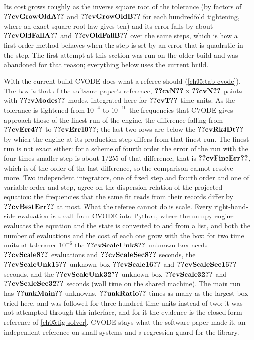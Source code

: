 Its cost grows roughly as the inverse square root of the tolerance (by factors of $\cfiveV{cvGrowOldA}$ and $\cfiveV{cvGrowOldB}$ for each hundredfold tightening, where an exact square-root law gives ten) and its error falls by about $\cfiveV{cvOldFallA}$ and $\cfiveV{cvOldFallB}$ over the same steps, which is how a first-order method behaves when the step is set by an error that is quadratic in the step.
The first attempt at this section was run on the older build and was abandoned for that reason; everything below uses the current build.

With the current build CVODE does what a referee should (\cref{ch05:tab-cvode}).
The box is that of the software paper's reference, $\cfiveV{cvN}\times\cfiveV{cvN}$ points with $\cfiveV{cvModes}$ modes, integrated here for $\cfiveV{cvT}$ time units.
As the tolerance is tightened from $10^{-4}$ to $10^{-10}$ the frequencies that CVODE gives approach those of the finest run of the engine, the difference falling from $\cfiveV{cvErr4}$ to $\cfiveV{cvErr10}$; the last two rows are below the $\cfiveV{cvRk4Dt}$ by which the engine at its production step differs from that finest run.
The finest run is not exact either: for a scheme of fourth order the error of the run with the four times smaller step is about $1/255$ of that difference, that is $\cfiveV{cvFineErr}$, which is of the order of the last difference, so the comparison cannot resolve more.
Two independent integrators, one of fixed step and fourth order and one of variable order and step, agree on the dispersion relation of the projected equation: the frequencies that the same fit reads from their records differ by $\cfiveV{cvBestErr}$ at most.
What the referee cannot do is scale.
Every right-hand-side evaluation is a call from CVODE into Python, where the numpy engine evaluates the equation and the state is converted to and from a list, and both the number of evaluations and the cost of each one grow with the box: for two time units at tolerance $10^{-6}$ the $\cfiveV{cvScaleUnk8}$-unknown box needs $\cfiveV{cvScale8}$ evaluations and $\cfiveV{cvScaleSec8}$ seconds, the $\cfiveV{cvScaleUnk16}$-unknown box $\cfiveV{cvScale16}$ and $\cfiveV{cvScaleSec16}$ seconds, and the $\cfiveV{cvScaleUnk32}$-unknown box $\cfiveV{cvScale32}$ and $\cfiveV{cvScaleSec32}$ seconds (wall time on the shared machine).
The main run has $\cfiveV{unkMain}$ unknowns, $\cfiveV{unkRatio}$ times as many as the largest box tried here, and was followed for three hundred time units instead of two; it was not attempted through this interface, and for it the evidence is the closed-form reference of \cref{ch05:fig-solver}.
CVODE stays what the software paper made it, an independent reference on small systems and a regression guard for the library.

